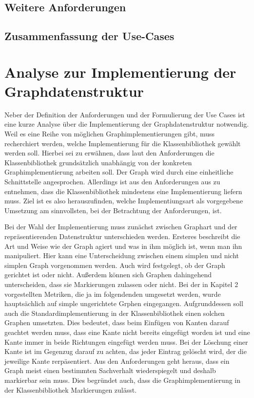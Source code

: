 \documentclass[a4paper,12pt,ngerman,chapterprefix=false,listof=totoc,bibliography=totoc]{scrreprt}
\begin{document}
{{\subsection{Weitere Anforderungen}

\subsection{Zusammenfassung der Use-Cases}

\section{Analyse zur Implementierung der Graphdatenstruktur}
{
Neber der Definition der Anforderungen und der Formulierung der Use Cases ist eine kurze Analyse über die Implementierung der Graphdatenstruktur notwendig. Weil es eine Reihe von möglichen Graphimplementierungen gibt, muss recherchiert werden, welche Implementierung für die Klassenbibliothek gewählt werden soll. Hierbei sei zu erwähnen, dass laut den Anforderungen die Klassenbibliothek grundsätzlich unabhängig von der konkreten Graphimplementierung arbeiten soll. Der Graph wird durch eine einheitliche Schnittstelle angesprochen. Allerdings ist aus den Anforderungen aus zu entnehmen, dass die Klassenbibliothek mindestens eine Implementierung liefern muss. Ziel ist es also herauszufinden, welche Implementiungsart als vorgegebene Umsetzung am sinnvollsten, bei der Betrachtung der Anforderungen, ist.

Bei der Wahl der Implementierung muss zunächst zwischen Graphart und der repräsentierenden Datenstruktur unterschieden werden. Ersteres beschreibt die Art und Weise wie der Graph agiert und was in ihm möglich ist, wenn man ihn manipuliert. Hier kann eine Unterscheidung zwischen einem simplen und nicht simplen Graph vorgenommen werden. Auch wird festgelegt, ob der Graph gerichtet ist oder nicht. Außerdem können sich Graphen dahingehend unterscheiden, dass sie Markierungen zulassen oder nicht. Bei der in Kapitel 2 vorgestellten Metriken, die ja im folgendenden umgesetzt werden, wurde hauptsächlich auf simple ungerichtete Grphen eingegangen. Aufgrunddessen soll auch die Standardimplementierung in der Klassenbibliothek einen solchen Graphen umsetzten. Dies bedeutet, dass beim Einfügen von Kanten darauf geachtet werden muss, dass eine Kante nicht bereits eingefügt worden ist und eine Kante immer in beide Richtungen eingefügt werden muss. Bei der Löschung einer Kante ist im Gegenzug darauf zu achten, das jeder Eintrag gelöscht wird, der die jeweilige Kante rerpäsentiert. Aus den Anforderungen geht heraus, dass ein Graph meist einen bestimmten Sachverhalt wiederspiegelt und deshalb markierbar sein muss. Dies begründet auch, dass die Graphimplementierung in der Klassenbibliothek Markierungen zulässt.

}}}
\end{document}
